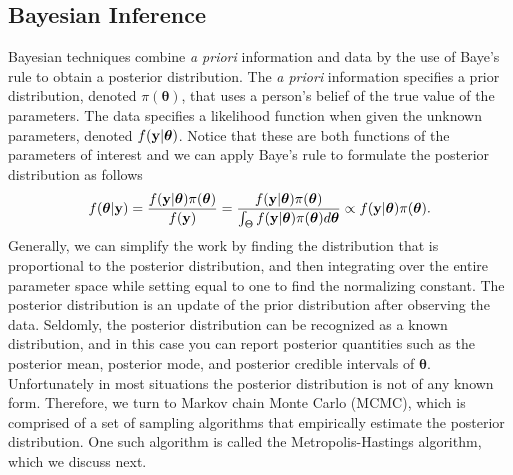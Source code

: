 \documentclass[12pt]{extarticle}
\begin{document}
\subsection{Bayesian Inference}
\noindent Bayesian techniques combine {\it a priori} information and data by the use of Baye's rule to obtain a posterior distribution.  The {\it a priori} information specifies a prior distribution, denoted $\pi(\boldsymbol\theta)$, that uses a person's belief of the true value of the parameters.  The data specifies a likelihood function when given the unknown parameters, denoted $f({\bf y}| \boldsymbol\theta)$.  Notice that these are both functions of the parameters of interest and we can apply Baye's rule to formulate the posterior distribution as follows
\begin{align*}
f(\boldsymbol\theta|{\bf y}) = \frac{f({\bf y}| \boldsymbol\theta)\pi(\boldsymbol\theta)}{f({\bf y})} = \frac{f({\bf y}| \boldsymbol\theta)\pi(\boldsymbol\theta)}{\int_\Theta f({\bf y}|\boldsymbol\theta)\pi(\boldsymbol\theta)d\boldsymbol\theta} \propto f({\bf y}| \boldsymbol\theta)\pi(\boldsymbol\theta).
\end{align*}
Generally, we can simplify the work by finding the distribution that is proportional to the posterior distribution, and then integrating over the entire parameter space while setting equal to one to find the normalizing constant.  The posterior distribution is an update of the prior distribution after observing the data.  Seldomly, the posterior distribution can be recognized as a known distribution, and in this case you can report posterior quantities such as the posterior mean, posterior mode, and posterior credible intervals of $\bm\theta$.  Unfortunately in most situations the posterior distribution is not of any known form.  Therefore, we turn to Markov chain Monte Carlo (MCMC), which is comprised of a set of sampling algorithms that empirically estimate the posterior distribution.  One such algorithm is called the Metropolis-Hastings algorithm, which we discuss next.
\end{document}
